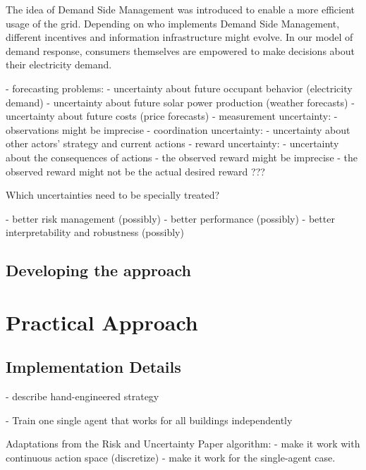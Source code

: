 The idea of Demand Side Management was introduced to enable a more efficient usage of the grid.
Depending on who implements Demand Side Management, different incentives and information infrastructure might evolve.
In our model of demand response, consumers themselves are empowered to make decisions about their electricity demand.


- forecasting problems:
    - uncertainty about future occupant behavior (electricity demand)
    - uncertainty about future solar power production (weather forecasts)
    - uncertainty about future costs (price forecasts)
- measurement uncertainty:
    - observations might be imprecise
- coordination uncertainty:
    - uncertainty about other actors' strategy and current actions
- reward uncertainty:
    - uncertainty about the consequences of actions
    - the observed reward might be imprecise
    - the observed reward might not be the actual desired reward ???
    
Which uncertainties need to be specially treated?

- better risk management (possibly)
- better performance (possibly)
- better interpretability and robustness (possibly)


\subsection{Developing the approach}

\section{Practical Approach}
\subsection{Implementation Details}
- describe hand-engineered strategy

- Train one single agent that works for all buildings independently

Adaptations from the Risk and Uncertainty Paper algorithm:
- make it work with continuous action space (discretize)
- make it work for the single-agent case.

